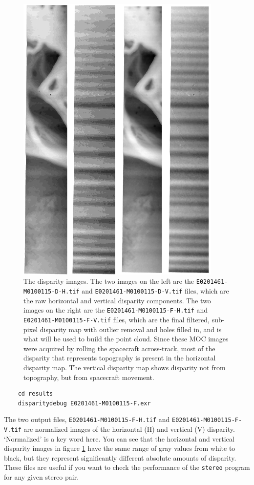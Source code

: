 \begin{figure}[b!]
\begin{minipage}{4in}
\includegraphics[width=4in]{images/p19-disparity.png}
\end{minipage}
\hfill
\begin{minipage}{2.7in}
\caption[P19 disparity images]{
    \label{p19-disparity}
	The disparity images.  The two images on the left are the
	\texttt{E0201461-M0100115-D-H.tif} and 
	\texttt{E0201461-M0100115-D-V.tif} files, which are the raw horizontal and
	vertical disparity components.  The two images on the right are the
	\texttt{E0201461-M0100115-F-H.tif} and
	\texttt{E0201461-M0100115-F-V.tif} files, which are the final
	filtered, sub-pixel disparity map with outlier removal and holes 
	filled in, and is what will be used to build the point cloud.  Since
	these MOC images were acquired by rolling the spacecraft across-track,
	most of the disparity that represents topography is present in the 
	horizontal disparity map.  The vertical disparity map shows disparity
	not from topography, but from spacecraft movement.
    }
\end{minipage}
\end{figure}

\begin{verbatim}
    cd results
    disparitydebug E0201461-M0100115-F.exr
\end{verbatim}
\noindent
The two output files, \texttt{E0201461-M0100115-F-H.tif} and
\texttt{E0201461-M0100115-F-V.tif} are normalized images of the
horizontal (H) and vertical (V) disparity.  `Normalized' is a key
word here.  You can see that the horizontal and vertical disparity
images in figure \ref{p19-disparity} have the same range of gray
values from white to black, but they represent significantly different
absolute amounts of disparity.  These files are useful if you want
to check the performance of the \texttt{stereo} program for any
given stereo pair.

